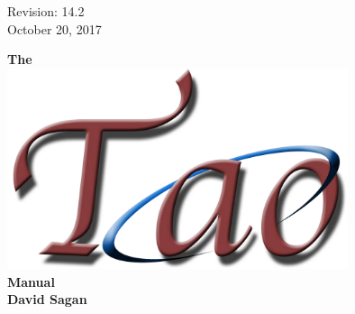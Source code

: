 \thispagestyle{empty}

\begin{flushright}
\large
Revision: 14.2 \\
October 20, 2017 \\
\end{flushright}

\vfill


{
\begin{center}
{\Huge \sf\bf The} \\
\vskip 0.1in
\includegraphics[width=10cm]{tao-logo.pdf} \\
\vskip 0.1in
{\Huge \sf\bf Manual} \\
\vskip 0.4in
{\huge \sf\bf David Sagan} \\
\end{center}
}

\vfill
\break
